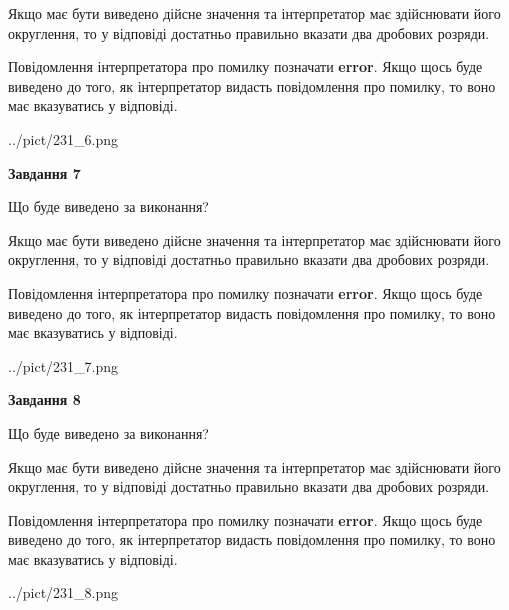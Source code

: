 \documentclass[12pt, ukrainian]{article}
\begin{document}
{\begin {Large}
Якщо має бути виведено дійсне значення та інтерпретатор має здійснювати його округлення, 
то у відповіді достатньо правильно вказати два дробових розряди.

Повідомлення інтерпретатора про помилку позначати \textbf{error}.
Якщо щось буде виведено до того, як інтерпретатор видасть повідомлення про помилку, 
то воно має вказуватись у відповіді. \par

\begin{center}
	{../pict/231_6.png}
\end{center}
\newpage

{\begin {center}\textbf{Завдання 7}\end {center}}\par
Що буде виведено за виконання? \par

Якщо має бути виведено дійсне значення та інтерпретатор має здійснювати його округлення, 
то у відповіді достатньо правильно вказати два дробових розряди.

Повідомлення інтерпретатора про помилку позначати \textbf{error}.
Якщо щось буде виведено до того, як інтерпретатор видасть повідомлення про помилку, 
то воно має вказуватись у відповіді. \par

\begin{center}
	{../pict/231_7.png}
\end{center}
\newpage

{\begin {center}\textbf{Завдання 8}\end {center}}\par
Що буде виведено за виконання? \par

Якщо має бути виведено дійсне значення та інтерпретатор має здійснювати його округлення, 
то у відповіді достатньо правильно вказати два дробових розряди.

Повідомлення інтерпретатора про помилку позначати \textbf{error}.
Якщо щось буде виведено до того, як інтерпретатор видасть повідомлення про помилку, 
то воно має вказуватись у відповіді. \par

\begin{center}
	{../pict/231_8.png}
\end{center}
\newpage


\end{Large}}
\end{document}
